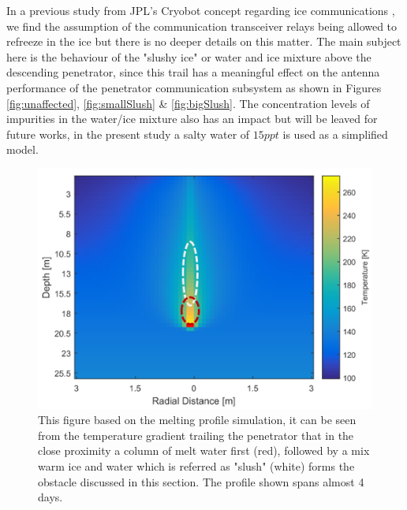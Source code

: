 



In a previous study from JPL's Cryobot concept regarding ice communications \cite{iceLink-scott}, we find the assumption of the communication transceiver relays being allowed to refreeze in the ice but there is no deeper details on this matter. The main subject here is the behaviour of the "slushy ice" or water and ice mixture above the descending penetrator, since this trail has a meaningful effect on the antenna performance of the penetrator communication subsystem as shown in Figures \ref{fig:unaffected}, \ref{fig:smallSlush} \& \ref{fig:bigSlush}. The concentration levels of impurities in the water/ice mixture also has an impact but will be leaved for future works, in the present study a salty water of $15ppt$ is used as a simplified model.

\begin{figure}[htb]
	\centering
	\includegraphics[width=.66\textwidth]{figures/comms/slushTrail}
	\caption{This figure based on the melting profile simulation, it can be seen from the temperature gradient trailing the penetrator that in the close proximity a column of melt water first (red), followed by a mix warm ice and water which is referred as "slush" (white) forms the obstacle discussed in this section. The profile shown spans almost 4 days.}
	\label{fig:through-ice_comms}
\end{figure}

